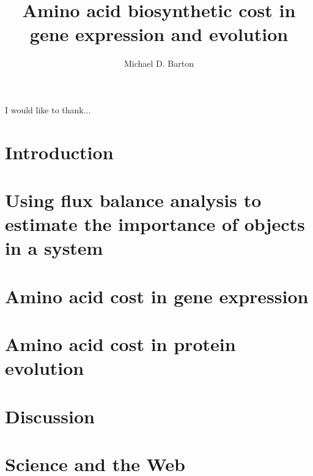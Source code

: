 \documentclass[12pt,PhD]{muthesis}
\begin{document}
\title{Amino acid biosynthetic cost in gene expression and evolution}
\author{Michael D. Barton}

\beforeabstract
{}

\afterabstract
{}
I would like to thank...
\afterpreface


\chapter{Introduction}

\chapter{Using flux balance analysis to estimate the importance of objects in a system}

\chapter{Amino acid cost in gene expression}

\chapter{Amino acid cost in protein evolution}

\chapter{Discussion}

\chapter{Science and the Web}




\end{document}
